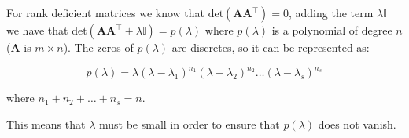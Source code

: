 For rank deficient matrices we know that $\text{det}(\mathbf{A A^\top})=0$, adding the
term $\lambda \mathbb{I}$ we have that $\text{det}(\mathbf{A A^\top}+\lambda \mathbb{I}) =
p(\lambda)$ where $p(\lambda)$ is a polynomial of degree $n$ ($\mathbf{A}$ is
$m \times n$). The zeros of $p(\lambda)$ are discretes, so it can be represented
as:

\[
p(\lambda) =
\lambda(\lambda-\lambda_1)^{n_1}(\lambda-\lambda_2)^{n_2}\dots(\lambda-\lambda_s)^{n_s}
\]

\noindent where $n_1 + n_2 + \dots + n_s = n$.

This means that $\lambda$ must be small in order to ensure that $p(\lambda)$
does not vanish.


%
%
%
%
%
%
%
%
%
%
